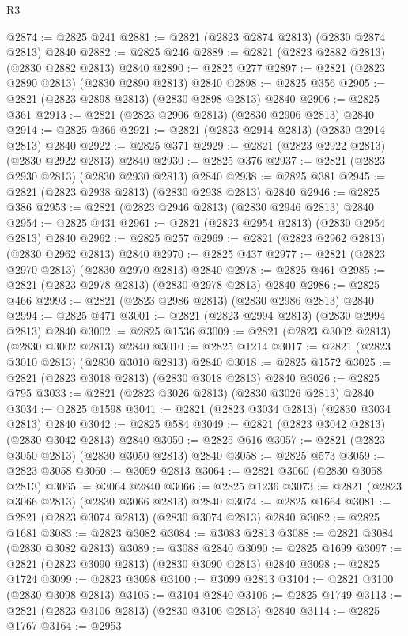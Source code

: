 \begin{lexlean}{R3}
\begin{coremodule}
@2874 := @2825 @241
@2881 := @2821 (@2823 @2874 @2813) (@2830 @2874 @2813) @2840
@2882 := @2825 @246
@2889 := @2821 (@2823 @2882 @2813) (@2830 @2882 @2813) @2840
@2890 := @2825 @277
@2897 := @2821 (@2823 @2890 @2813) (@2830 @2890 @2813) @2840
@2898 := @2825 @356
@2905 := @2821 (@2823 @2898 @2813) (@2830 @2898 @2813) @2840
@2906 := @2825 @361
@2913 := @2821 (@2823 @2906 @2813) (@2830 @2906 @2813) @2840
@2914 := @2825 @366
@2921 := @2821 (@2823 @2914 @2813) (@2830 @2914 @2813) @2840
@2922 := @2825 @371
@2929 := @2821 (@2823 @2922 @2813) (@2830 @2922 @2813) @2840
@2930 := @2825 @376
@2937 := @2821 (@2823 @2930 @2813) (@2830 @2930 @2813) @2840
@2938 := @2825 @381
@2945 := @2821 (@2823 @2938 @2813) (@2830 @2938 @2813) @2840
@2946 := @2825 @386
@2953 := @2821 (@2823 @2946 @2813) (@2830 @2946 @2813) @2840
@2954 := @2825 @431
@2961 := @2821 (@2823 @2954 @2813) (@2830 @2954 @2813) @2840
@2962 := @2825 @257
@2969 := @2821 (@2823 @2962 @2813) (@2830 @2962 @2813) @2840
@2970 := @2825 @437
@2977 := @2821 (@2823 @2970 @2813) (@2830 @2970 @2813) @2840
@2978 := @2825 @461
@2985 := @2821 (@2823 @2978 @2813) (@2830 @2978 @2813) @2840
@2986 := @2825 @466
@2993 := @2821 (@2823 @2986 @2813) (@2830 @2986 @2813) @2840
@2994 := @2825 @471
@3001 := @2821 (@2823 @2994 @2813) (@2830 @2994 @2813) @2840
@3002 := @2825 @1536
@3009 := @2821 (@2823 @3002 @2813) (@2830 @3002 @2813) @2840
@3010 := @2825 @1214
@3017 := @2821 (@2823 @3010 @2813) (@2830 @3010 @2813) @2840
@3018 := @2825 @1572
@3025 := @2821 (@2823 @3018 @2813) (@2830 @3018 @2813) @2840
@3026 := @2825 @795
@3033 := @2821 (@2823 @3026 @2813) (@2830 @3026 @2813) @2840
@3034 := @2825 @1598
@3041 := @2821 (@2823 @3034 @2813) (@2830 @3034 @2813) @2840
@3042 := @2825 @584
@3049 := @2821 (@2823 @3042 @2813) (@2830 @3042 @2813) @2840
@3050 := @2825 @616
@3057 := @2821 (@2823 @3050 @2813) (@2830 @3050 @2813) @2840
@3058 := @2825 @573
@3059 := @2823 @3058
@3060 := @3059 @2813
@3064 := @2821 @3060 (@2830 @3058 @2813)
@3065 := @3064 @2840
@3066 := @2825 @1236
@3073 := @2821 (@2823 @3066 @2813) (@2830 @3066 @2813) @2840
@3074 := @2825 @1664
@3081 := @2821 (@2823 @3074 @2813) (@2830 @3074 @2813) @2840
@3082 := @2825 @1681
@3083 := @2823 @3082
@3084 := @3083 @2813
@3088 := @2821 @3084 (@2830 @3082 @2813)
@3089 := @3088 @2840
@3090 := @2825 @1699
@3097 := @2821 (@2823 @3090 @2813) (@2830 @3090 @2813) @2840
@3098 := @2825 @1724
@3099 := @2823 @3098
@3100 := @3099 @2813
@3104 := @2821 @3100 (@2830 @3098 @2813)
@3105 := @3104 @2840
@3106 := @2825 @1749
@3113 := @2821 (@2823 @3106 @2813) (@2830 @3106 @2813) @2840
@3114 := @2825 @1767
@3164 := @2953

\end{coremodule}
\end{lexlean}

